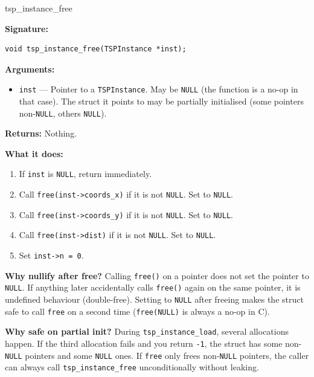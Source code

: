 \documentclass[11pt]{article}
\begin{document}
\begin{apispec}{tsp\_instance\_free}

\textbf{Signature:}
\begin{lstlisting}[style=cstyle, numbers=none]
void tsp_instance_free(TSPInstance *inst);
\end{lstlisting}

\textbf{Arguments:}
\begin{itemize}
  \item \texttt{inst} --- Pointer to a \texttt{TSPInstance}. May be \texttt{NULL} (the function is a no-op in that case). The struct it points to may be partially initialised (some pointers non-\texttt{NULL}, others \texttt{NULL}).
\end{itemize}

\textbf{Returns:} Nothing.

\textbf{What it does:}
\begin{enumerate}[label=\arabic*.]
  \item If \texttt{inst} is \texttt{NULL}, return immediately.
  \item Call \texttt{free(inst->coords\_x)} if it is not \texttt{NULL}. Set to \texttt{NULL}.
  \item Call \texttt{free(inst->coords\_y)} if it is not \texttt{NULL}. Set to \texttt{NULL}.
  \item Call \texttt{free(inst->dist)} if it is not \texttt{NULL}. Set to \texttt{NULL}.
  \item Set \texttt{inst->n = 0}.
\end{enumerate}

\textbf{Why nullify after free?} Calling \texttt{free()} on a pointer does not set the pointer to \texttt{NULL}. If anything later accidentally calls \texttt{free()} again on the same pointer, it is undefined behaviour (double-free). Setting to \texttt{NULL} after freeing makes the struct safe to call \texttt{free} on a second time (\texttt{free(NULL)} is always a no-op in C).

\textbf{Why safe on partial init?} During \texttt{tsp\_instance\_load}, several allocations happen. If the third allocation fails and you return \texttt{-1}, the struct has some non-\texttt{NULL} pointers and some \texttt{NULL} ones. If \texttt{free} only frees non-\texttt{NULL} pointers, the caller can always call \texttt{tsp\_instance\_free} unconditionally without leaking.

\end{apispec}

\vspace{8pt}
\end{document}
